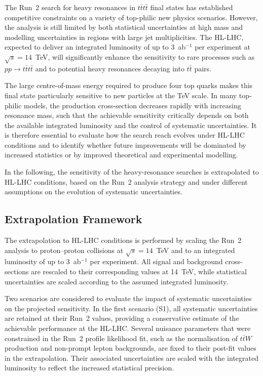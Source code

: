 ﻿The Run~2 search for heavy resonances in $t\bar{t}t\bar{t}$ final states has established competitive constraints on a variety of top-philic new physics scenarios. 
However, the analysis is still limited by both statistical uncertainties at high mass and modelling uncertainties in regions with large jet multiplicities. 
The HL-LHC, expected to deliver an integrated luminosity of up to 3~ab$^{-1}$ per experiment at $\sqrt{s}=14$~TeV, will significantly enhance the sensitivity to rare processes such as $pp \to t\bar{t}t\bar{t}$ and to potential heavy resonances decaying into $t\bar{t}$ pairs.

The large centre-of-mass energy required to produce four top quarks makes this final state particularly sensitive to new particles at the TeV scale. 
In many top-philic models, the production cross-section decreases rapidly with increasing resonance mass, such that the achievable sensitivity critically depends on both the available integrated luminosity and the control of systematic uncertainties. 
It is therefore essential to evaluate how the search reach evolves under HL-LHC conditions and to identify whether future improvements will be dominated by increased statistics or by improved theoretical and experimental modelling.

In the following, the sensitivity of the heavy-resonance searches is extrapolated to HL-LHC conditions, based on the Run~2 analysis strategy and under different assumptions on the evolution of systematic uncertainties.

\subsection{Extrapolation Framework}
\label{sec:HL_framework}

The extrapolation to HL-LHC conditions is performed by scaling the Run~2 analysis to proton--proton collisions at $\sqrt{s}=14$~TeV and to an integrated luminosity of up to 3~ab$^{-1}$ per experiment. 
All signal and background cross-sections are rescaled to their corresponding values at 14~TeV, while statistical uncertainties are scaled according to the assumed integrated luminosity.

Two scenarios are considered to evaluate the impact of systematic uncertainties on the projected sensitivity. 
In the first scenario (S1), all systematic uncertainties are retained at their Run~2 values, providing a conservative estimate of the achievable performance at the HL-LHC. 
Several nuisance parameters that were constrained in the Run~2 profile likelihood fit, such as the normalisation of $t\bar{t}W$ production and non-prompt lepton backgrounds, are fixed to their post-fit values in the extrapolation. 
Their associated uncertainties are scaled with the integrated luminosity to reflect the increased statistical precision.

